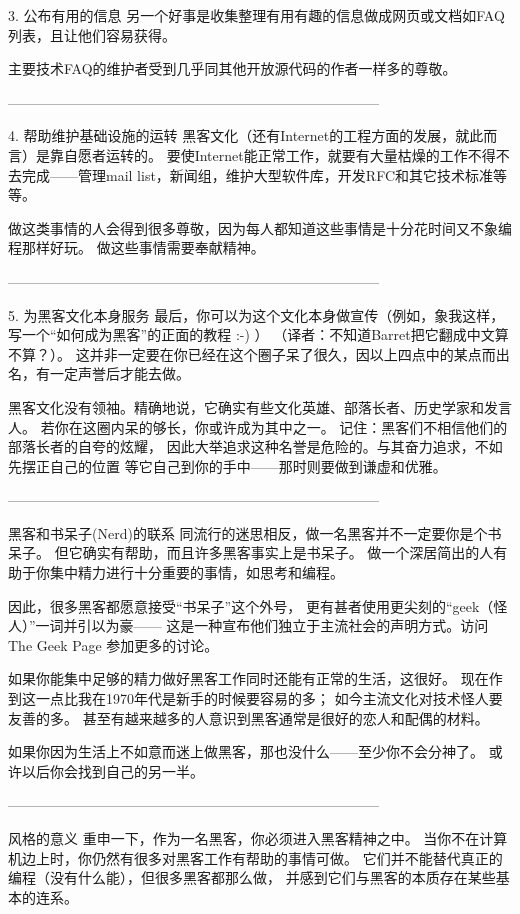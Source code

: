\documentclass[a4paper,12pt,UTF8,twoside]{ctexbook}
\begin{document}
3. 公布有用的信息
另一个好事是收集整理有用有趣的信息做成网页或文档如FAQ列表，且让他们容易获得。

主要技术FAQ的维护者受到几乎同其他开放源代码的作者一样多的尊敬。


--------------------------------------------------------------------------------

4. 帮助维护基础设施的运转
黑客文化（还有Internet的工程方面的发展，就此而言）是靠自愿者运转的。 要使Internet能正常工作，就要有大量枯燥的工作不得不去完成——管理mail list，新闻组，维护大型软件库，开发RFC和其它技术标准等等。

做这类事情的人会得到很多尊敬，因为每人都知道这些事情是十分花时间又不象编程那样好玩。 做这些事情需要奉献精神。


--------------------------------------------------------------------------------

5. 为黑客文化本身服务
最后，你可以为这个文化本身做宣传（例如，象我这样，写一个“如何成为黑客”的正面的教程 :-) ） （译者：不知道Barret把它翻成中文算不算？）。 这并非一定要在你已经在这个圈子呆了很久，因以上四点中的某点而出名，有一定声誉后才能去做。

黑客文化没有领袖。精确地说，它确实有些文化英雄、部落长者、历史学家和发言人。 若你在这圈内呆的够长，你或许成为其中之一。 记住：黑客们不相信他们的部落长者的自夸的炫耀， 因此大举追求这种名誉是危险的。与其奋力追求，不如先摆正自己的位置 等它自己到你的手中——那时则要做到谦虚和优雅。


--------------------------------------------------------------------------------

黑客和书呆子(Nerd)的联系
同流行的迷思相反，做一名黑客并不一定要你是个书呆子。 但它确实有帮助，而且许多黑客事实上是书呆子。 做一个深居简出的人有助于你集中精力进行十分重要的事情，如思考和编程。

因此，很多黑客都愿意接受“书呆子”这个外号， 更有甚者使用更尖刻的“geek（怪人）”一词并引以为豪—— 这是一种宣布他们独立于主流社会的声明方式。访问 The Geek Page 参加更多的讨论。

如果你能集中足够的精力做好黑客工作同时还能有正常的生活，这很好。 现在作到这一点比我在1970年代是新手的时候要容易的多； 如今主流文化对技术怪人要友善的多。 甚至有越来越多的人意识到黑客通常是很好的恋人和配偶的材料。

如果你因为生活上不如意而迷上做黑客，那也没什么——至少你不会分神了。 或许以后你会找到自己的另一半。


--------------------------------------------------------------------------------

风格的意义
重申一下，作为一名黑客，你必须进入黑客精神之中。 当你不在计算机边上时，你仍然有很多对黑客工作有帮助的事情可做。 它们并不能替代真正的编程（没有什么能），但很多黑客都那么做， 并感到它们与黑客的本质存在某些基本的连系。
\end{document}
